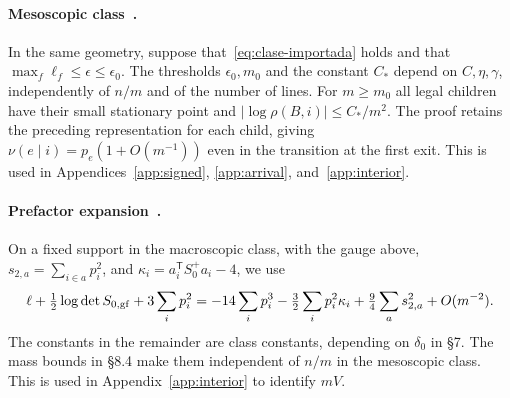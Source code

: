 \paragraph{Mesoscopic class~\cite[\S8.1 and Thm.~8.1]{pc}.} In the same geometry, suppose
that~\eqref{eq:clase-importada} holds and that \(\max_f\ell_f\le\epsilon\le\epsilon_0\). The thresholds
\(\epsilon_0,m_0\) and the constant \(C_*\) depend on \(C,\eta,\gamma\), independently of \(n/m\) and of
the number of lines. For \(m\ge m_0\) all legal children have their small stationary point and
\(|\log\rho(B,i)|\le C_*/m^2\). The proof retains the preceding representation for each child, giving
\(\nu(e\mid i)=p_e(1+O(m^{-1}))\) even in the transition at the first exit. This is used in
Appendices~\ref{app:signed}, \ref{app:arrival}, and~\ref{app:interior}.

\paragraph{Prefactor expansion~\cite[\S\S7.5--7.8 and 8.4]{pc}.} On a fixed support in the macroscopic
class, with the gauge above, \(s_{2,a}=\sum_{i\in a}p_i^2\), and \(\kappa_i=a_i^{\mathsf T}S_0^+a_i-4\),
we use
\[
 \ell+\tfrac12\log\det S_{0,\rm gf}+3\sum_i p_i^2
   =-14\sum_i p_i^3-\tfrac32\sum_i p_i^2\kappa_i
       +\tfrac94\sum_a s_{2,a}^2+O(m^{-2}).
\]
The constants in the remainder are class constants, depending on \(\delta_0\) in §7. The mass bounds in
§8.4 make them independent of \(n/m\) in the mesoscopic class. This is used in
Appendix~\ref{app:interior} to identify \(mV\).

